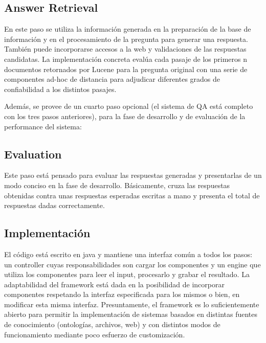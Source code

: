 \bigskip

\subsection{Answer Retrieval}
En este paso se utiliza la informaci\'on generada en la preparaci\'on
de la base de informaci\'on y en el procesamiento de la pregunta para
generar una respuesta. Tambi\'en puede incorporarse accesos a la web y
validaciones de las respuestas candidatas. La implementaci\'on concreta
eval\'ua cada pasaje de los primeros n documentos retornados por Lucene
para la pregunta original con una serie de componentes ad-hoc de
distancia para adjudicar diferentes grados de confiabilidad a los
distintos pasajes. \newline


Adem\'as, se provee de un cuarto paso opcional (el sistema de QA est\'a
completo con los tres pasos anteriores), para la fase de desarrollo y
de evaluaci\'on de la performance del sistema:\newline


\subsection{Evaluation}

Este paso est\'a pensado para evaluar las respuestas generadas y
presentarlas de un modo conciso en la fase de desarrollo.
B\'asicamente, cruza las respuestas obtenidas contra unas respuestas
esperadas escritas a mano y presenta el total de respuestas dadas
correctamente.


\bigskip

\subsection{Implementaci\'on}

El c\'odigo est\'a escrito en java y mantiene una interfaz com\'un a
todos los pasos: un controller cuyas responsabilidades son cargar los
componentes y un engine que utiliza los componentes para leer el input,
procesarlo y grabar el resultado. La adaptabilidad del framework est\'a
dada en la posibilidad de incorporar componentes respetando la interfaz
especificada para los mismos o bien, en modificar esta misma interfaz.
Presuntamente, el framework es lo suficientemente abierto para permitir
la implementaci\'on de sistemas basados en distintas fuentes de
conocimiento (ontolog\'ias, archivos, web) y con distintos modos de
funcionamiento mediante poco esfuerzo de customizaci\'on.

